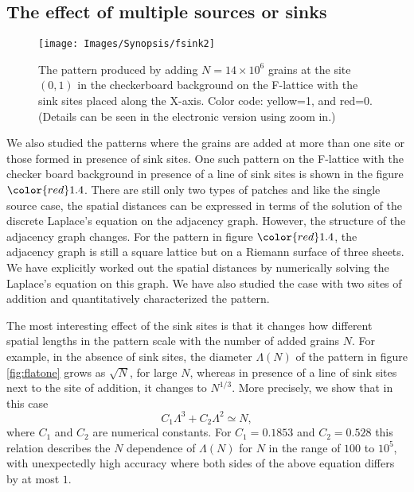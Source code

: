 \documentclass[11pt,a4paper]{book}
\begin{document}
\subsection{The effect of multiple sources or sinks}
\begin{figure}[t]
\begin{center}
\texttt{[image: Images/Synopsis/fsink2]}
\label{fig:fsink}
\caption{The pattern produced by adding $N=14\times 10^6$ grains at
the site
$\left( 0,1 \right)$ in the checkerboard background on the F-lattice with
the sink sites placed along the X-axis. Color code: yellow=1, and
red=0.
(Details can be seen in the electronic version using zoom in.)}
\end{center}
\end{figure}
We also studied the patterns where the grains are added at more than
one site or those formed in presence of sink sites. One such
pattern on the F-lattice with the checker board background in presence
of a line of sink sites is shown in the figure ${\color{red}1.4}$.
There are still only two types of patches and like
the single source case, the spatial
distances can be expressed in terms of the solution of the discrete
Laplace's equation on the adjacency graph. However, the structure of
the adjacency graph changes. For the pattern in figure
${ \color{red}1.4 }$, the adjacency graph is still a square lattice but on a
Riemann surface of three sheets.
We have explicitly worked out the spatial distances by numerically
solving the Laplace's equation on this graph. We have also studied the case with two sites of
addition and quantitatively characterized the pattern.

The most interesting effect of the sink sites is that it changes how
different spatial lengths in the pattern scale with the number of added
grains $N$. For example, in the absence of sink sites, the diameter
$\Lambda\left( N \right)$ of the pattern in figure \ref{fig:flatone}
grows as $\sqrt{N}$, for large $N$, whereas in presence of a line of
sink sites next to the site of addition, it changes to $N^{1/3}$. More
precisely, we show that in this case
\begin{equation}
C_{1}\Lambda^{3}+C_{2}\Lambda^{2}\simeq N,
\label{eq:lrel}
\end{equation}
where $C_{1}$ and $C_{2}$ are numerical constants.
For $C_{1}=0.1853$ and $C_{2}=0.528$ this relation describes the $N$ dependence of $\Lambda\left( N \right)$ for
$N$ in the range of $100$ to $10^{5}$, with unexpectedly high accuracy where both sides of the above equation
differs by at most $1$.
\end{document}
